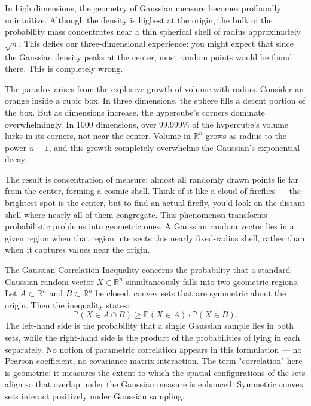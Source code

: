 In high dimensions, the geometry of Gaussian measure becomes profoundly unintuitive. Although the density is highest at the origin, the bulk of the probability mass concentrates near a thin spherical shell of radius approximately \( \sqrt{n} \). This defies our three-dimensional experience: you might expect that since the Gaussian density peaks at the center, most random points would be found there. This is completely wrong.

The paradox arises from the explosive growth of volume with radius. Consider an orange inside a cubic box. In three dimensions, the sphere fills a decent portion of the box. But as dimensions increase, the hypercube's corners dominate overwhelmingly. In 1000 dimensions, over 99.999\% of the hypercube's volume lurks in its corners, not near the center. Volume in \( \mathbb{R}^n \) grows as radius to the power \( n-1 \), and this growth completely overwhelms the Gaussian's exponential decay.

The result is concentration of measure: almost all randomly drawn points lie far from the center, forming a cosmic shell. Think of it like a cloud of fireflies — the brightest spot is the center, but to find an actual firefly, you'd look on the distant shell where nearly all of them congregate. This phenomenon transforms probabilistic problems into geometric ones. A Gaussian random vector lies in a given region when that region intersects this nearly fixed-radius shell, rather than when it captures values near the origin.

The Gaussian Correlation Inequality concerns the probability that a standard Gaussian random vector \( X \in \mathbb{R}^n \) simultaneously falls into two geometric regions. Let \( A \subset \mathbb{R}^n \) and \( B \subset \mathbb{R}^n \) be closed, convex sets that are symmetric about the origin. Then the inequality states:
\[
\mathbb{P}(X \in A \cap B) \geq \mathbb{P}(X \in A) \cdot \mathbb{P}(X \in B).
\]
The left-hand side is the probability that a single Gaussian sample lies in both sets, while the right-hand side is the product of the probabilities of lying in each separately. No notion of parametric correlation appears in this formulation — no Pearson coefficient, no covariance matrix interaction. The term "correlation" here is geometric: it measures the extent to which the spatial configurations of the sets align so that overlap under the Gaussian measure is enhanced. Symmetric convex sets interact positively under Gaussian sampling.

